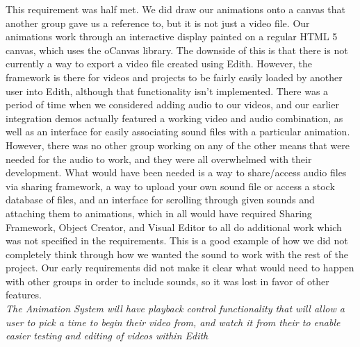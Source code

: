 \documentclass[12pt]{article}
\begin{document}
This requirement was half met. We did draw our animations onto a canvas that another group gave us a reference to, but it is not just a video file. Our animations work through an interactive display painted on a regular HTML 5 canvas, which uses the oCanvas library. The downside of this is that there is not currently a way to export a video file created using Edith. However, the framework is there for videos and projects to be fairly easily loaded by another user into Edith, although that functionality isn’t implemented. There was a period of time when we considered adding audio to our videos, and our earlier integration demos actually featured a working video and audio combination, as well as an interface for easily associating sound files with a particular animation. However, there was no other group working on any of the other means that were needed for the audio to work, and they were all overwhelmed with their development. What would have been needed is a way to share/access audio files via sharing framework, a way to upload your own sound file or access a stock database of files, and an interface for scrolling through given sounds and attaching them to animations, which in all would have required Sharing Framework, Object Creator, and Visual Editor to all do additional work which was not specified in the requirements. This is a good example of how we did not completely think through how we wanted the sound to work with the rest of the project. Our early requirements did not make it clear what would need to happen with other groups in order to include sounds, so it was lost in favor of other features. \\

\textit{The Animation System will have playback control functionality that will allow a user to pick a time to begin their video from, and watch it from their to enable easier testing and editing of videos within Edith}\\
\end{document}
